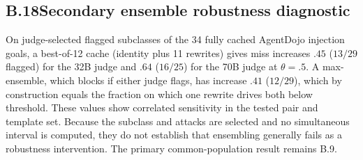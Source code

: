 \subsection*{B.18\quad Secondary ensemble robustness diagnostic}
On judge-selected flagged subclasses of the 34 fully cached AgentDojo injection goals, a
best-of-12 cache (identity plus 11 rewrites) gives miss increases $.45$ ($13/29$
flagged) for the 32B judge and $.64$ ($16/25$) for the 70B judge at $\theta=.5$. A
max-ensemble, which blocks if either judge flags, has increase $.41$ ($12/29$), which
by construction equals the fraction on which one rewrite drives both below threshold. These values show correlated sensitivity in the
tested pair and template set. Because the subclass and attacks are selected
and no simultaneous interval is computed, they do not establish that
ensembling generally fails as a robustness intervention. The primary
common-population result remains B.9.
 


